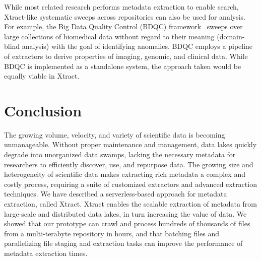 \documentclass[sigconf]{acmart}
\newcommand{\tyler}[1]{}
\newcommand{\tyler}[1]{{\textcolor{cyan}{ tyler: #1 }}}
\newcommand{\name}{Xtract}
\begin{document}
While most related research performs metadata extraction to enable search,
\name{}-like systematic sweeps across repositories can also be used for analysis.  
For example, the Big Data Quality Control (BDQC) framework~\cite{deutsch2018bdqc} sweeps over 
large collections of biomedical data without regard to their meaning (domain-blind analysis) with the goal of
identifying anomalies.
BDQC employs a pipeline of extractors to derive properties of imaging, genomic, and clinical data.
While BDQC is implemented as a standalone system, the approach taken would be equally 
viable in \name{}.


\section{Conclusion}
\label{sec:conclusion}

The growing volume, velocity, and variety of scientific data is becoming unmanageable.  
Without proper maintenance and management, data lakes quickly degrade 
into unorganized data swamps, lacking the necessary metadata for researchers 
to efficiently discover, use, and repurpose data. 
The growing size and heterogeneity of scientific data makes extracting rich 
metadata a complex and costly process, requiring a suite of customized extractors
and advanced extraction techniques. %
We have described a serverless-based approach for metadata extraction, 
called \name{}. 
\name{} enables the scalable extraction of metadata from large-scale and distributed data lakes,
in turn increasing the value of data. 
We showed that our prototype can crawl and process hundreds of thousands of files from a multi-terabyte 
repository in hours, and that batching files and parallelizing file staging 
and extraction tasks can improve the performance of
metadata extraction times. 
\end{document}
